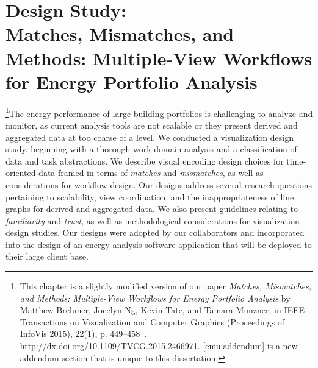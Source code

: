 
\chapter[Design Study\texorpdfstring{:\\ Matches, Mismatches, and Methods: Multiple-View Workflows for Energy Portfolio Analysis}{}]{Design Study\texorpdfstring{:\\ \large{Matches, Mismatches, and Methods: Multiple-View Workflows for Energy Portfolio Analysis}}{}}
\label{ch:emu}



\footnote{This chapter is a slightly modified version of our paper {\it Matches, Mismatches, and Methods: Multiple-View Workflows for Energy Portfolio Analysis} by Matthew Brehmer, Jocelyn Ng, Kevin Tate, and Tamara Munzner; in IEEE Transactions on Visualization and Computer Graphics (Proceedings of InfoVis 2015), 22(1), p. 449--458~\cite{Brehmer2015}. \url{http://dx.doi.org/10.1109/TVCG.2015.2466971}. \autoref{emu:addendum} is a new addendum section that is unique to this dissertation.}The energy performance of large building portfolios is challenging to analyze and monitor, as current analysis tools are not scalable or they present derived and aggregated data at too coarse of a level. 
We conducted a visualization design study, beginning with a thorough work domain analysis and a classification of data and task abstractions. 
We describe visual encoding design choices for time-oriented data framed in terms of {\it matches} and {\it mismatches}, as well as considerations for workflow design. 
Our designs address several research questions pertaining to scalability, view coordination, and the inappropriateness of line graphs for derived and aggregated data. 
We also present guidelines relating to {\it familiarity} and {\it trust}, as well as methodological considerations for visualization design studies. 
Our designs were adopted by our collaborators and incorporated into the design of an energy analysis software application that will be deployed to their large client base.

